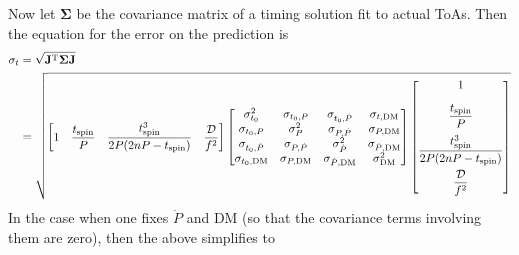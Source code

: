\documentclass{book}
\begin{document}
\newcommand{\pcov}{\ensuremath{\mathbf{\Sigma}}}
Now let $\pcov$ be the covariance matrix of a timing solution fit to actual ToAs.
Then the equation for the error on the prediction is
\begin{equation}
  \begin{aligned}
    \sigma_t
      &= \sqrt{{\bf J}^{\rm T} \pcov {\bf J}} \\
      &= \sqrt{
         \begin{bmatrix}
           1 & \dfrac{\tspin}{P} & \dfrac{\tspin^3}{2P(2nP - \tspin)} & \dfrac{\mathcal{D}}{f^2}
         \end{bmatrix}
         \begin{bmatrix}
           \sigma_{t_0}^2 & \sigma_{t_0,P} & \sigma_{t_0,\dot{P}} & \sigma_{t,{\rm DM}} \\
           \sigma_{t_0,P} & \sigma_{P}^2 & \sigma_{P,\dot{P}} & \sigma_{P,{\rm DM}} \\
           \sigma_{t_0,\dot{P}} & \sigma_{P,\dot{P}} & \sigma_{\dot{P}}^2 & \sigma_{\dot{P},{\rm DM}} \\
           \sigma_{t_0,{\rm DM}} & \sigma_{P,{\rm DM}} & \sigma_{\dot{P},{\rm DM}} & \sigma_{{\rm DM}}^2
         \end{bmatrix}
         \begin{bmatrix}
           1 \\[10pt] \dfrac{\tspin}{P} \\[10pt] \dfrac{\tspin^3}{2P(2nP - \tspin)} \\[10pt] \dfrac{\mathcal{D}}{f^2}
         \end{bmatrix}
         }
  \end{aligned}
\end{equation}
In the case when one fixes $\dot{P}$ and DM (so that the covariance terms involving them are zero), then the above simplifies to
\end{document}

